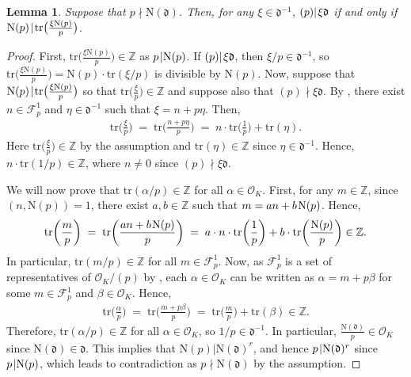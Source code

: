 \documentclass[11pt]{amsart}
\newtheorem{lemma}[theorem]{Lemma}
\theoremstyle{remark}
\newcommand\cl[1]{\mathcal{#1}}
\newcommand\fr[1]{\mathfrak{#1}}
\newcommand{\inte}{\mathbb{Z}}
\newcommand{\clo}{\mathcal{O}}
\newcommand{\eq}{\;=\;}
\def\thin{{\hskip 1pt}}
\newcommand{\N}{\mathrm{N}}
\newcommand{\tr}{\mathrm{tr}}
\begin{document}
\begin{lemma}
\label{npnmid}
Suppose that $p\nmid\N(\fr{d})$. Then, for any $\xi\in\fr{d}^{-1}$, $(p)|\thin\xi\fr{d}$ if and only if $\N(p)\thin|\thin\tr\big(\frac{\xi\N(p)}{p}\big)$.
\end{lemma}
\begin{proof}
First, $\tr\big(\frac{\xi\N(p)}{p}\big)\in\inte$ as $p\thin|\N(p)$. If $(p)|\thin\xi\fr{d}$, then $\xi/p\in\fr{d}^{-1}$, so $\tr\big(\frac{\xi\N(p)}{p}\big)=\N(p)\cdot\tr(\xi/p)$ is divisible by $\N(p)$. Now, suppose that $\N(p)\thin|\thin\tr\big(\frac{\xi\N(p)}{p}\big)$ so that $\tr\big(\frac{\xi}{p}\big)\in\inte$ and suppose also that $(p)\nmid\xi\fr{d}$.  By , there exist $n\in\cl{F}_p^1$ and $\eta\in\fr{d}^{-1}$ such that $\xi=n+p\eta$. Then,
\begin{align*}
    \tr\bigg(\frac{\xi}{p}\bigg)\eq\tr\bigg(\frac{n+p\eta}{p}\bigg)\eq n\cdot\tr\bigg(\frac{1}{p}\bigg)+\tr(\eta).
\end{align*}
Here $\tr\big(\frac{\xi}{p}\big)\in\inte$ by the assumption and $\tr(\eta)\in\inte$ since $\eta\in\fr{d}^{-1}$. Hence, $n\cdot\tr(1/p)\in\inte$, where $n\neq 0$ since $(p)\nmid\xi\fr{d}$.

We will now prove that $\tr(\alpha/p)\in\inte$ for all $\alpha\in\clo_K$. First, for any $m\in\inte$, since $(n,\N(p))=1$, there exist $a,b\in\inte$ such that $m=an+b\thin\N(p)$. Hence,
\begin{align*}
    \tr\bigg(\frac{m}{p}\bigg)\eq\tr\bigg(\frac{an+b\thin\N(p)}{p}\bigg)\eq a\cdot n\cdot\tr\bigg(\frac{1}{p}\bigg)+b\cdot\tr\bigg(\frac{\N(p)}{p}\bigg)\in\inte.
\end{align*}
In particular, $\tr(m/p)\in\inte$ for all $m\in\cl{F}_p^1$. Now, as $\cl{F}_p^1$ is a set of representatives of $\clo_K/(p)$ by , each $\alpha\in\clo_K$ can be written as $\alpha=m+p\beta$ for some $m\in\cl{F}_p^1$ and $\beta\in\clo_K$. Hence,
\begin{align*}
    \tr\bigg(\frac{\alpha}{p}\bigg)\eq\tr\bigg(\frac{m+p\beta}{p}\bigg)\eq \tr\bigg(\frac{m}{p}\bigg)+\tr(\beta)\in\inte.
\end{align*}
Therefore, $\tr(\alpha/p)\in\inte$ for all $\alpha\in\clo_K$, so $1/p\in\fr{d}^{-1}$. In particular, $\frac{\N(\fr{d})}{p}\in\clo_K$ since $\N(\fr{d})\in\fr{d}$. This implies that $\N(p)|\N(\fr{d})^r$, and hence $p\thin|\N(\fr{d})^r$ since $p\thin|\N(p)$, which leads to contradiction as $p\nmid\N(\fr{d})$ by the assumption.
\end{proof}
\end{document}
